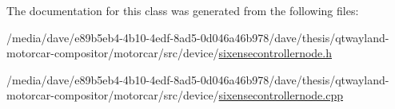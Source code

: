 The documentation for this class was generated from the following files\-:\begin{DoxyCompactItemize}
\item 
/media/dave/e89b5eb4-\/4b10-\/4edf-\/8ad5-\/0d046a46b978/dave/thesis/qtwayland-\/motorcar-\/compositor/motorcar/src/device/\hyperlink{sixensecontrollernode_8h}{sixensecontrollernode.\-h}\item 
/media/dave/e89b5eb4-\/4b10-\/4edf-\/8ad5-\/0d046a46b978/dave/thesis/qtwayland-\/motorcar-\/compositor/motorcar/src/device/\hyperlink{sixensecontrollernode_8cpp}{sixensecontrollernode.\-cpp}\end{DoxyCompactItemize}
